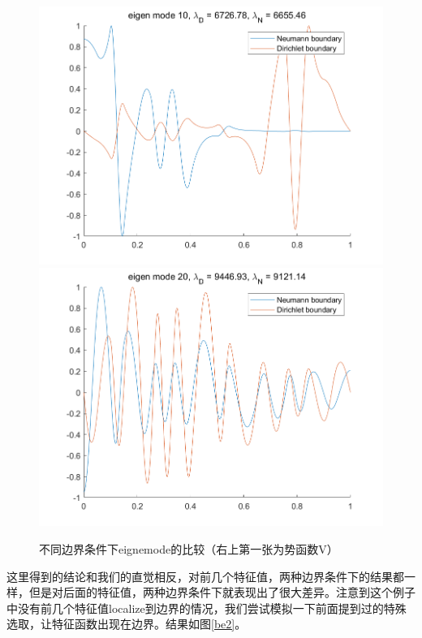 \documentclass[12pt,a4paper]{article}
\begin{document}
\begin{figure}[htbp]
\includegraphics[width=0.24\linewidth]{boundary/E1(10)}
\includegraphics[width=0.24\linewidth]{boundary/E1(20)}
\caption{不同边界条件下eignemode的比较（右上第一张为势函数V）}
\label{be1}
\end{figure}

这里得到的结论和我们的直觉相反，对前几个特征值，两种边界条件下的结果都一样，但是对后面的特征值，两种边界条件下就表现出了很大差异。注意到这个例子中没有前几个特征值localize到边界的情况，我们尝试模拟一下前面提到过的特殊选取，让特征函数出现在边界。结果如图\ref{be2}。
\end{document}
